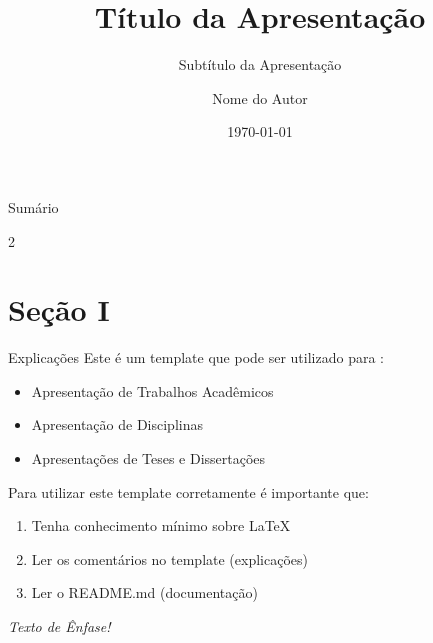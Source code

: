 \documentclass{libs/ufc_format}
\title[short title]{\huge\textbf{Título da Apresentação}}
\subtitle{Subtítulo da Apresentação}
\author{Nome do Autor}
\institute[GREI/UFC]{
    \normalsize{\email{usuario@dominio}}
    \newline
    \department{GREI -- Grupo de Redes Elétricas Inteligentes}
    \newline
    \ufc
}
\date{\today}
\begin{document}


\begin{frame}{}
    \maketitle
\end{frame}

\begin{frame}{Sumário}
    \begin{multicols}{2}
        \tableofcontents
    \end{multicols}
\end{frame}

\section{Seção I}
\begin{frame}{Explicações}
    Este é um template que pode ser utilizado para \nocite{Template_Beamer_UFC}:
    \begin{itemize}
        \item Apresentação de Trabalhos Acadêmicos
        \item Apresentação de Disciplinas
        \item Apresentações de Teses e Dissertações
    \end{itemize}

    \vspace{0.4cm} %
    
    Para utilizar este template corretamente é importante que:
    \begin{enumerate}
        \item Tenha conhecimento mínimo sobre LaTeX
        \item Ler os comentários no template (explicações)
        \item Ler o README.md (documentação)
    \end{enumerate}

    \vspace{0.2cm}

     \emph{Texto de Ênfase!}
\end{frame}
\end{document}
